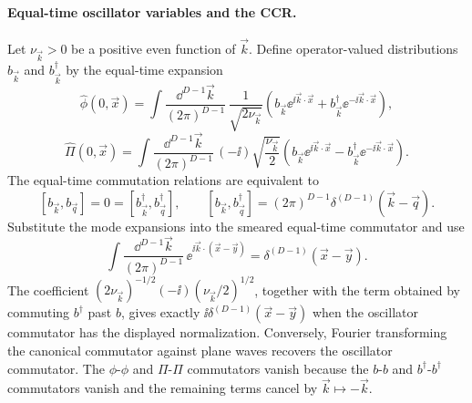 \paragraph{Equal-time oscillator variables and the CCR.}
Let \(\nu_{\vec k}>0\) be a positive even function of \(\vec k\). Define
operator-valued distributions \(b_{\vec k}\) and \(b^\dagger_{\vec k}\) by the
equal-time expansion
\[
  \widehat\phi(0,\vec x)
  =
  \int\frac{\dd^{D-1}\vec k}{(2\pi)^{D-1}}\,
  \frac{1}{\sqrt{2\nu_{\vec k}}}
  \left(
    b_{\vec k}\ee^{\ii\vec k\cdot\vec x}
    +
    b^\dagger_{\vec k}\ee^{-\ii\vec k\cdot\vec x}
  \right),
\]
\[
  \widehat\Pi(0,\vec x)
  =
  \int\frac{\dd^{D-1}\vec k}{(2\pi)^{D-1}}\,
  (-\ii)\sqrt{\frac{\nu_{\vec k}}{2}}
  \left(
    b_{\vec k}\ee^{\ii\vec k\cdot\vec x}
    -
    b^\dagger_{\vec k}\ee^{-\ii\vec k\cdot\vec x}
  \right).
\]
The equal-time commutation relations are equivalent to
\[
  [b_{\vec k},b_{\vec q}]=0
  =
  [b^\dagger_{\vec k},b^\dagger_{\vec q}],
  \qquad
  [b_{\vec k},b^\dagger_{\vec q}]
  =
  (2\pi)^{D-1}\delta^{(D-1)}(\vec k-\vec q).
\]
Substitute the mode expansions into the smeared equal-time commutator and use
\[
  \int\frac{\dd^{D-1}\vec k}{(2\pi)^{D-1}}\,
  \ee^{\ii\vec k\cdot(\vec x-\vec y)}
  =
  \delta^{(D-1)}(\vec x-\vec y).
\]
The coefficient
\((2\nu_{\vec k})^{-1/2}(-\ii)(\nu_{\vec k}/2)^{1/2}\), together with the
term obtained by commuting \(b^\dagger\) past \(b\), gives exactly
\(\ii\delta^{(D-1)}(\vec x-\vec y)\) when the oscillator commutator has the
displayed normalization.  Conversely, Fourier transforming the canonical
commutator against plane waves recovers the oscillator commutator.  The
\(\phi\)-\(\phi\) and \(\Pi\)-\(\Pi\) commutators vanish because the
\(b\)-\(b\) and \(b^\dagger\)-\(b^\dagger\) commutators vanish and the
remaining terms cancel by \(\vec k\mapsto-\vec k\).

